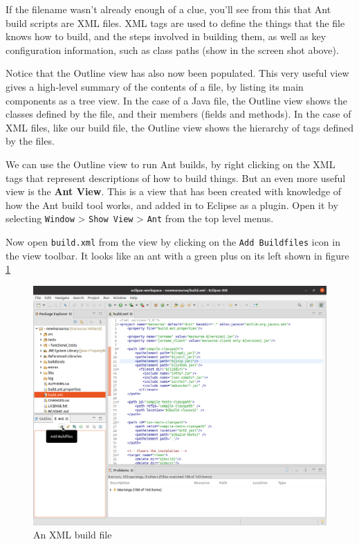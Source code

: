 \documentclass[
]{book}
\begin{document}
If the filename wasn't already enough of a clue, you'll see from this that Ant build scripts are XML files. XML tags are used to define the things that the file knows how to build, and the steps involved in building them, as well as key configuration information, such as class paths (show in the screen shot above).

Notice that the Outline view has also now been populated. This very useful view gives a high-level summary of the contents of a file, by listing its main components as a tree view. In the case of a Java file, the Outline view shows the classes defined by the file, and their members (fields and methods). In the case of XML files, like our build file, the Outline view shows the hierarchy of tags defined by the files.

We can use the Outline view to run Ant builds, by right clicking on the XML tags that represent descriptions of how to build things. But an even more useful view is the \textbf{Ant View}. This is a view that has been created with knowledge of how the Ant build tool works, and added in to Eclipse as a plugin. Open it by selecting \texttt{Window} \textgreater{} \texttt{Show\ View} \textgreater{} \texttt{Ant} from the top level menus.

Now open \texttt{build.xml} from the view by clicking on the \texttt{Add\ Buildfiles} icon in the view toolbar. It looks like an ant with a green plus on its left shown in figure \ref{fig:antAddBuildfile-fig}

\begin{figure}

{\centering \includegraphics[width=1\linewidth]{images/2.1antAddBuildfile} 

}

\caption{An XML build file}\label{fig:antAddBuildfile-fig}
\end{figure}
\end{document}
